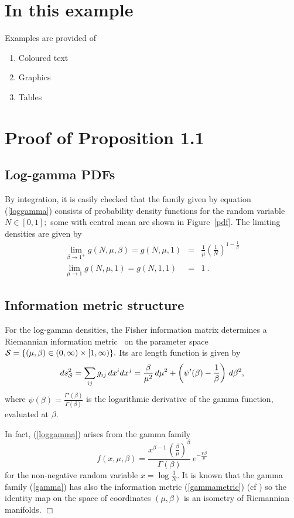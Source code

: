 \documentclass[a4paper,twoside]{article}      %
\begin{document}
\section{In this example}
Examples are provided of
\begin{enumerate}
\item Coloured text~\pageref{colour}
\item Graphics~\pageref{graphics}
\item Tables~\pageref{table}
\end{enumerate}

\section{Proof of Proposition 1.1}
\subsection{Log-gamma PDFs}
By integration, it is easily checked that the family given by
equation (\ref{loggamma}) consists of probability density
functions for the random variable $N\in [0,1];$ some with central
mean are shown in Figure~\ref{pdf}. The limiting densities are
given by
\begin{eqnarray}
\lim_{\beta\rightarrow 1^+}g(N,\mu,\beta) =
g(N,\mu,1)&=&\frac{1}{\mu}\left(\frac{1}{N}\right)^
      {1 - \frac{1}{\mu }} \\
     \lim_{\mu\rightarrow 1}g(N,\mu,1) = g(N,1,1) &=& 1 \ .
\end{eqnarray}

\subsection{Information metric structure} For the log-gamma
densities, the Fisher information matrix determines a Riemannian
information metric~\cite{amari} on the parameter space ${\cal
S}=\{(\mu,\beta)\in (0,\infty)\times[1,\infty)\}.$ Its arc length
function is given by
\begin{equation}
ds_{\cal{S}}^2=\sum_{ij} g_{ij} \, dx^i dx^j =\frac{\beta}{\mu^2}
\, d\mu^2 +
        \left(\psi'(\beta) -\frac{1}{\beta}\right)\, d\beta^2 , \label{gammametric}
\end{equation}
where $\psi(\beta)=\frac{\Gamma'(\beta)}{\Gamma(\beta)}$ is the
logarithmic derivative of the gamma function, evaluated at
$\beta.$

In fact, (\ref{loggamma}) arises from the gamma family
\begin{equation}
f(x,\mu,\beta) = \frac{ x^{\beta -1} \,
     (\frac{\beta }{\mu})^\beta    }
     {\Gamma(\beta )} \,  e^{-\frac{V\,\beta }{\mu }}
     \label{gamma}
\end{equation}
for the non-negative random variable $x=\log\frac{1}{N}.$ It is
known that the gamma family (\ref{gamma}) has also the information
metric (\ref{gammametric}) (cf \cite{lauritzen}) so the identity
map on the space of coordinates $(\mu,\beta)$ is an isometry of
Riemannian manifolds. \hfill $\Box$
\end{document}
